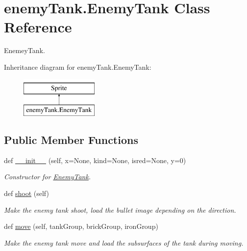 \hypertarget{classenemy_tank_1_1_enemy_tank}{}\section{enemy\+Tank.\+Enemy\+Tank Class Reference}
\label{classenemy_tank_1_1_enemy_tank}


Enemey\+Tank.  


Inheritance diagram for enemy\+Tank.\+Enemy\+Tank\+:\begin{figure}[H]
\begin{center}
\leavevmode
\includegraphics[height=2.000000cm]{classenemy_tank_1_1_enemy_tank}
\end{center}
\end{figure}
\subsection*{Public Member Functions}
\begin{DoxyCompactItemize}
\item 
def \mbox{\hyperlink{classenemy_tank_1_1_enemy_tank_a7be7fa26f9a80b3d4a6af7ef5c6871d9}{\+\_\+\+\_\+init\+\_\+\+\_\+}} (self, x=None, kind=None, isred=None, y=0)
\begin{DoxyCompactList}\small\item\em Constructor for \mbox{\hyperlink{classenemy_tank_1_1_enemy_tank}{Enemy\+Tank}}. \end{DoxyCompactList}\item 
def \mbox{\hyperlink{classenemy_tank_1_1_enemy_tank_a80e9ae99c38751cb1f3070eebf672311}{shoot}} (self)
\begin{DoxyCompactList}\small\item\em Make the enemy tank shoot, load the bullet image depending on the direction. \end{DoxyCompactList}\item 
def \mbox{\hyperlink{classenemy_tank_1_1_enemy_tank_ac00e5c1dbaae2fc25ce84d085fd82402}{move}} (self, tank\+Group, brick\+Group, iron\+Group)
\begin{DoxyCompactList}\small\item\em Make the enemy tank move and load the subsurfaces of the tank during moving. \end{DoxyCompactList}\end{DoxyCompactItemize}
